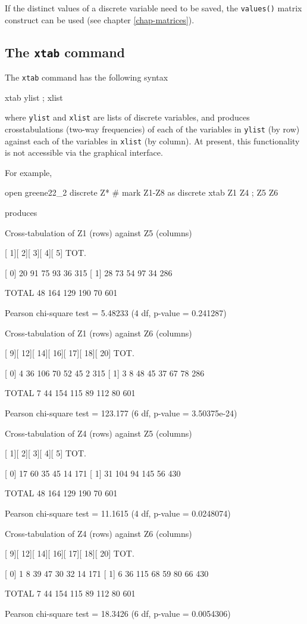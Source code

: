 If the distinct values of a discrete variable need to be saved, the
\texttt{values()} matrix construct can be used (see chapter
\ref{chap-matrices}).

\subsection{The \texttt{xtab} command}
\label{discr-xtab}

The \texttt{xtab} command has the following syntax
\begin{code}
  xtab ylist ; xlist
\end{code}
where \texttt{ylist} and \texttt{xlist} are lists of discrete
variables, and produces crosstabulations (two-way frequencies) of each
of the variables in \texttt{ylist} (by row) against each of the
variables in \texttt{xlist} (by column). At present, this
functionality is not accessible via the graphical interface.

For example, 
\begin{code}
  open greene22_2
  discrete Z* # mark Z1-Z8 as discrete
  xtab Z1 Z4 ; Z5 Z6
\end{code}
produces
\begin{code}
Cross-tabulation of Z1 (rows) against Z5 (columns)

       [   1][   2][   3][   4][   5]  TOT.
  
[   0]    20    91    75    93    36    315
[   1]    28    73    54    97    34    286

TOTAL     48   164   129   190    70    601

Pearson chi-square test = 5.48233 (4 df, p-value = 0.241287)

Cross-tabulation of Z1 (rows) against Z6 (columns)

       [   9][  12][  14][  16][  17][  18][  20]  TOT.
  
[   0]     4    36   106    70    52    45     2    315
[   1]     3     8    48    45    37    67    78    286

TOTAL      7    44   154   115    89   112    80    601

Pearson chi-square test = 123.177 (6 df, p-value = 3.50375e-24)

Cross-tabulation of Z4 (rows) against Z5 (columns)

       [   1][   2][   3][   4][   5]  TOT.
  
[   0]    17    60    35    45    14    171
[   1]    31   104    94   145    56    430

TOTAL     48   164   129   190    70    601

Pearson chi-square test = 11.1615 (4 df, p-value = 0.0248074)

Cross-tabulation of Z4 (rows) against Z6 (columns)

       [   9][  12][  14][  16][  17][  18][  20]  TOT.
  
[   0]     1     8    39    47    30    32    14    171
[   1]     6    36   115    68    59    80    66    430

TOTAL      7    44   154   115    89   112    80    601

Pearson chi-square test = 18.3426 (6 df, p-value = 0.0054306)
\end{code}


